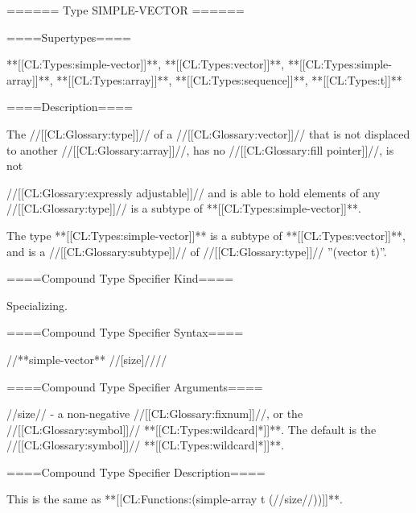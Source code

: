 ====== Type SIMPLE-VECTOR ======

====Supertypes====

**[[CL:Types:simple-vector]]**, **[[CL:Types:vector]]**, **[[CL:Types:simple-array]]**, **[[CL:Types:array]]**, **[[CL:Types:sequence]]**, **[[CL:Types:t]]**

====Description====

The //[[CL:Glossary:type]]// of a //[[CL:Glossary:vector]]// that is not displaced to another //[[CL:Glossary:array]]//, has no //[[CL:Glossary:fill pointer]]//, is not

//[[CL:Glossary:expressly adjustable]]// and is able to hold elements of any //[[CL:Glossary:type]]// is a subtype of **[[CL:Types:simple-vector]]**.

The type **[[CL:Types:simple-vector]]** is a subtype of **[[CL:Types:vector]]**, and is a //[[CL:Glossary:subtype]]// of //[[CL:Glossary:type]]// ''(vector t)''.

====Compound Type Specifier Kind====

Specializing.

====Compound Type Specifier Syntax====

//**simple-vector** //[size]////

====Compound Type Specifier Arguments====

//size// - a non-negative //[[CL:Glossary:fixnum]]//, or the //[[CL:Glossary:symbol]]// **[[CL:Types:wildcard|*]]**. The default is the //[[CL:Glossary:symbol]]// **[[CL:Types:wildcard|*]]**.

====Compound Type Specifier Description====

This is the same as **[[CL:Functions:(simple-array t (//size//))]]**.

